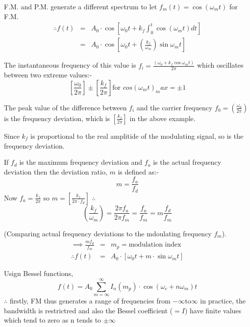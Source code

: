 \documentclass[11pt]{article} %
\begin{document}
F.M. and P.M. generate a different spectrum to let $f_m(t) = \cos{\left(\omega_mt\right)}$ for F.M.
\begin{eqnarray}
\therefore f(t) &=& A_0 \cdot \cos{\left[\omega_0t + k_f\int^t_0\cos{\left(\omega_mt\right)}dt\right]} \nonumber \\
&=& A_0\cdot\cos{\left[\omega_0t+\left( \frac{k_f}{\omega_m}\right)\sin{\omega_mt }\right]}
\end{eqnarray}

The instantaneous frequency of this value is $f_i = \frac{(\omega_0 +k_f\cos{\omega_mt})}{2\pi}$ which oscillates between two extreme values:-
\begin{equation}
\left[ \frac{\omega_0}{2\pi} \right] \pm \left[ \frac{k_f}{2\pi} \right] \mbox{for } cos(\omega_mt)_max=\pm 1
\end{equation}

The peak value of the difference between $f_i$ and the carrier frequency $f_0 = \left( \frac{\omega_0}{2\pi}\right)$ is the frequency deviation, which is $\left[ \frac{k_f}{2\pi}\right]$ in the above example.

Since $k_f$ is proportional to the real amplitide of the modulating signal, so is the frequency deviation.

If $f_d$ is the maximum frequency deviation and $f_a$ is the actual frequency deviation then the deviation ratio, $m$ is defined as:-
\begin{equation}
m=\frac{f_a}{f_d}
\end{equation}
Now $f_a = \frac{k_f}{2\pi}$ so $m=\left[\frac{k_f}{2\pi\cdot f_d}\right]$
$\therefore$ 
\begin{equation}
\left(\frac{k_f}{\omega_m}\right) = \frac{2\pi f_a}{2\pi f_m} = \frac{f_a}{f_m} = m\frac{f_d}{f_m}
\end{equation}

(Comparing actual frequency deviations to the mdoulating frequency $f_m$).
\begin{eqnarray}
\implies \frac{mf_d}{f_m} &=& m_p = \mbox{modulation index} \nonumber \\
\therefore f(t) &=& A_0 \cdot\left[\omega_0t+m\cdot\sin{\omega_mt}\right]
\end{eqnarray}

Usign Bessel functions, 
\begin{equation}
	f(t) = A_0 \sum_{m=\infty}^{\infty}{I_n(m_p)\cdot \cos{(\omega_c + n\omega_m)}t}
\end{equation}
$\therefore$ firstly, FM thus generates a range of frequencies from $-\infty$to$\infty$ in practice, the bandwidth is restrictred and also the Bessel coefficient ($=I$) have finite values which tend to zero as n tends to $\pm \infty$
\end{document}
